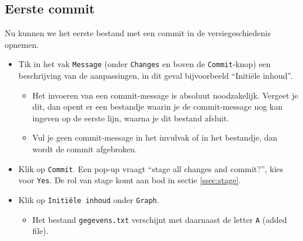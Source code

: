 \documentclass[kulak]{kulakarticle} %
\begin{document}
	\subsection{Eerste commit} Nu kunnen we het eerste bestand met een commit in de versiegeschiedenis opnemen. 
	\begin{itemize}
		\item Tik in het vak \texttt{Message} (onder \texttt{Changes} en boven de \texttt{Commit}-knop) een beschrijving van de aanpassingen, in dit geval bijvoorbeeld ``Initiële inhoud''.
		\begin{itemize}
		\item Het invoeren van een commit-message is absoluut noodzakelijk. Vergeet je dit, dan opent er een bestandje waarin je de commit-message nog kan ingeven op de eerste lijn, waarna je dit bestand afsluit.
		\item Vul je geen commit-message in het invulvak of in het bestandje, dan wordt de commit afgebroken.
		\end{itemize}
		\item Klik op \texttt{Commit}. Een pop-up vraagt ``stage all changes and commit?'', kies voor \texttt{Yes}. De rol van stage komt aan bod in sectie \ref{ssec:stage}.
		\item Klik op \texttt{Initiële inhoud} onder \texttt{Graph}.
		\begin{itemize}
			\item Het bestand \texttt{gegevens.txt} verschijnt met daarnaast de letter \texttt{A} (added file).
		\end{itemize}
	\end{itemize}
	
\end{document}
